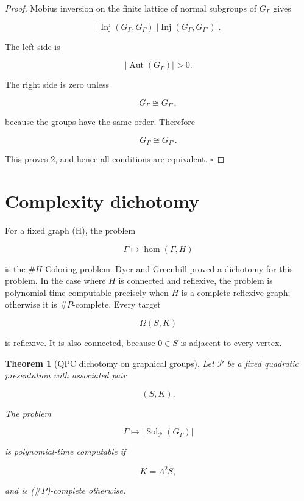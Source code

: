 \documentclass[11pt]{article}
\newtheorem{theorem}{Theorem}[section]
\begin{document}
\begin{proof}
Mobius inversion on the finite lattice of normal subgroups of $G_\Gamma$ gives

\[
|\operatorname{Inj}(G_\Gamma,G_\Gamma)|
|\operatorname{Inj}(G_\Gamma,G_{\Gamma'})|.
\]

The left side is

\[
|\operatorname{Aut}(G_\Gamma)|>0.
\]

The right side is zero unless

\[
G_\Gamma\cong G_{\Gamma'},
\]

because the groups have the same order. Therefore

\[
G_\Gamma\cong G_{\Gamma'}.
\]

This proves $2$, and hence all conditions are equivalent. $\square$

\end{proof}

\section{Complexity dichotomy}

For a fixed graph (H), the problem

\[
\Gamma\mapsto \operatorname{hom}(\Gamma,H)
\]

is the $\#H$-Coloring problem. Dyer and Greenhill proved a dichotomy for this problem. In the case where $H$ is connected and reflexive, the problem is polynomial-time computable precisely when $H$ is a complete reflexive graph; otherwise it is $\#P$-complete. Every target

\[
\Omega(S,K)
\]

is reflexive. It is also connected, because $0\in S$ is adjacent to every vertex.

\begin{theorem}[QPC dichotomy on graphical groups]
Let $\mathcal P$ be a fixed quadratic presentation with associated pair

\[
(S,K).
\]

The problem

\[
\Gamma\longmapsto |\operatorname{Sol}_{\mathcal P}(G_\Gamma)|
\]

is polynomial-time computable if

\[
K=\Lambda^2S,
\]

and is ($\#P$)-complete otherwise.

\end{theorem}
\end{document}
